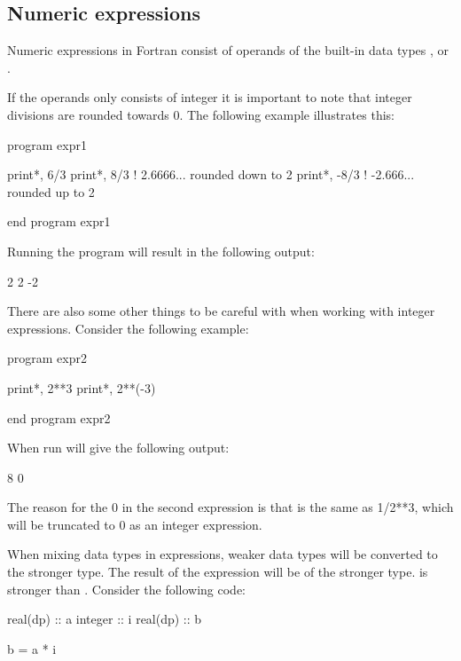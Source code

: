 \subsection{Numeric expressions}

Numeric expressions in Fortran consist of operands of the built-in data types ,  or .

If the operands only consists of integer it is important to note that integer divisions are rounded towards 0. The following example illustrates this:

\begin{fortrancodeenv}
program expr1

    print*, 6/3
    print*, 8/3   ! 2.6666... rounded down to 2
    print*, -8/3  ! -2.666... rounded up to 2

end program expr1
\end{fortrancodeenv}

Running the program will result in the following output:

\begin{fortrancodeenv}
           2
           2
          -2
\end{fortrancodeenv}

There are also some other things to be careful with when working with integer expressions. Consider the following example:

\begin{fortrancodeenv}
program expr2

    print*, 2**3
    print*, 2**(-3)

end program expr2
\end{fortrancodeenv}

When run will give the following output:

\begin{fortrancodeenv}
           8
           0
\end{fortrancodeenv}

The reason for the 0 in the second expression is that  is the same as 1/2**3, which will be truncated to 0 as an integer expression.

When mixing data types in expressions, weaker data types will be converted to the stronger type. The result of the expression will be of the stronger type.  is stronger than . Consider the following code:

\begin{fortrancodeenv}
real(dp) :: a
integer :: i
real(dp) :: b

b = a * i
\end{fortrancodeenv}

